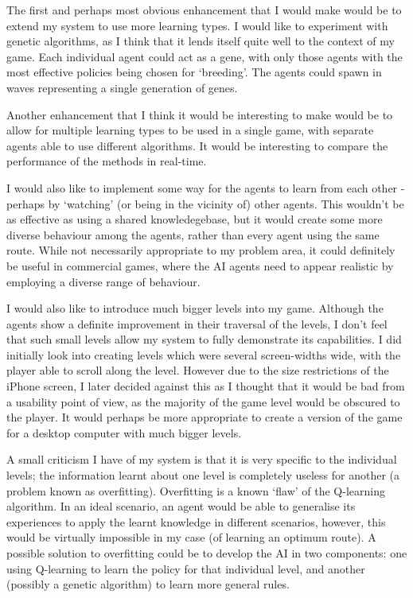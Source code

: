 \documentclass[a4paper,oneside]{report}
\begin{document}
The first and perhaps most obvious enhancement that I would make would be to extend my system to use more learning types. I would like to experiment with genetic algorithms, as I think that it lends itself quite well to the context of my game. Each individual agent could act as a gene, with only those agents with the most effective policies being chosen for `breeding'. The agents could spawn in waves representing a single generation of genes.

Another enhancement that I think it would be interesting to make would be to allow for multiple learning types to be used in a single game, with separate agents able to use different algorithms. It would be interesting to compare the performance of the methods in real-time. 

I would also like to implement some way for the agents to learn from each other - perhaps by `watching' (or being in the vicinity of) other agents. This wouldn't be as effective as using a shared knowledegebase, but it would create some more diverse behaviour among the agents, rather than every agent using the same route. While not necessarily appropriate to my problem area, it could definitely be useful in commercial games, where the AI agents need to appear realistic by employing a diverse range of behaviour.

I would also like to introduce much bigger levels into my game. Although the agents show a definite improvement in their traversal of the levels, I don't feel that such small levels allow my system to fully demonstrate its capabilities. I did initially look into creating levels which were several screen-widths wide, with the player able to scroll along the level. However due to the size restrictions of the iPhone screen, I later decided against this as I thought that it would be bad from a usability point of view, as the majority of the game level would be obscured to the player. It would perhaps be more appropriate to create a version of the game for a desktop computer with much bigger levels.

A small criticism I have of my system is that it is very specific to the individual levels; the information learnt about one level is completely useless for another (a problem known as overfitting). Overfitting is a known `flaw' of the Q-learning algorithm. In an ideal scenario, an agent would be able to generalise its experiences to apply the learnt knowledge in different scenarios, however, this would be virtually impossible in my case (of learning an optimum route). A possible solution to overfitting could be to develop the AI in two components: one using Q-learning to learn the policy for that individual level, and another (possibly a genetic algorithm) to learn more general rules. 
\end{document}
